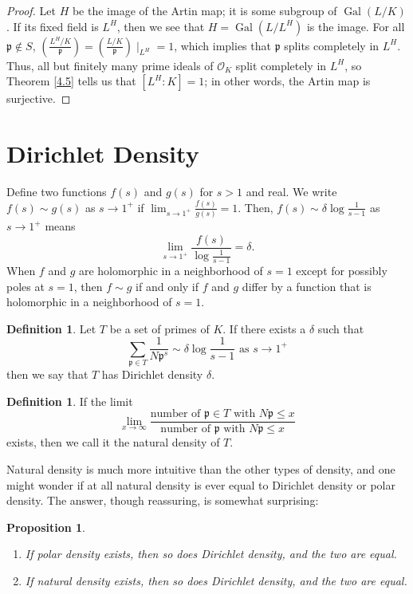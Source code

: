 \documentclass{article}
\DeclareMathOperator{\Gal}{Gal}
\theoremstyle{plain}
\newtheorem{prop}[thm]{Proposition}
\theoremstyle{definition}
\newtheorem{defn}[thm]{Definition}
\theoremstyle{remark}
\numberwithin{equation}{section}
\numberwithin{thm}{section}
\begin{document}
\begin{proof}
Let $H$ be the image of the Artin map; it is some subgroup of $\Gal(L/K)$. If its fixed field is $L^{H}$, then we see that $H = \Gal(L/L^{H})$ is the image. For all $\mathfrak{p} \not\in S$, $\left(\frac{L^{H}/K}{\mathfrak{p}}\right) = \left(\frac{L/K}{\mathfrak{p}}\right) \mid_{L^{H}} = 1$, which implies that $\mathfrak{p}$ splits completely in $L^{H}$. Thus, all but finitely many prime ideals of $\mathcal{O}_K$ split completely in $L^{H}$, so Theorem \ref{4.5} tells us that $[L^{H} : K] = 1$; in other words, the Artin map is surjective. 
\end{proof}


\section{Dirichlet Density}

Define two functions $f(s)$ and $g(s)$ for $s > 1$ and real. We write $f(s) \sim g(s)$ as $s \to 1^{+}$ if $\lim_{s \to 1^{+}} \frac{f(s)}{g(s)} = 1$. Then, $f(s) \sim \delta\log\frac{1}{s - 1}$ as $s \to 1^{+}$ means $$\lim_{s \to 1^{+}} \frac{f(s)}{\log \frac{1}{s - 1}} = \delta.$$ When $f$ and $g$ are holomorphic in a neighborhood of $s = 1$ except for possibly poles at $s = 1$, then $ f \sim g$ if and only if $f$ and $g$ differ by a function that is holomorphic in a neighborhood of $s = 1$. 

\begin{defn}
Let $T$ be a set of primes of $K$. If there exists a $\delta$ such that $$\sum_{\mathfrak{p} \in T} \frac{1}{N\mathfrak{p}^{s}} \sim \delta\log\frac{1}{s - 1} \text{ as } s \to 1^{+}$$ then we say that $T$ has Dirichlet density $\delta$. 
\end{defn}

\begin{defn}
If the limit $$\lim_{x \to \infty} \frac{\text{number of } \mathfrak{p} \in T \text{ with } N\mathfrak{p} \leq x}{\text{number of } \mathfrak{p} \text{ with } N\mathfrak{p} \leq x}$$ exists, then we call it the natural density of $T$. 
\end{defn}

Natural density is much more intuitive than the other types of density, and one might wonder if at all natural density is ever equal to Dirichlet density or polar density. The answer, though reassuring, is somewhat surprising:

\begin{prop}

$ $ \\ \vspace{-0.4cm} 


\begin{enumerate}

\item If polar density exists, then so does Dirichlet density, and the two are equal.

\item If natural density exists, then so does Dirichlet density, and the two are equal. 

\end{enumerate}

\end{prop}
\end{document}
